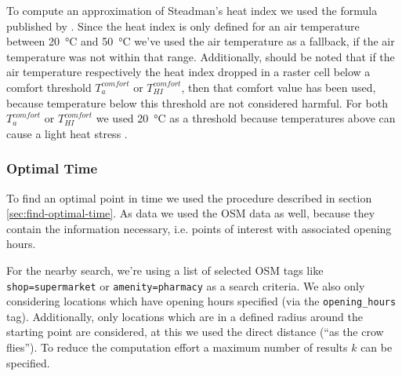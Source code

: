 To compute an approximation of Steadman's heat index we used the formula published by \textcite[77]{Stull2011}. Since the heat index is only defined for an air temperature between \SI{20}{\celsius} and \SI{50}{\celsius} we've used the air temperature as a fallback, if the air temperature was not within that range. Additionally, should be noted that if the air temperature respectively the heat index dropped in a raster cell below a comfort threshold $T_a^{comfort}$ or $T_{HI}^{comfort}$, then that comfort value has been used, because temperature below this threshold are not considered harmful. For both  $T_a^{comfort}$ or $T_{HI}^{comfort}$ we used \SI{20}{\celsius} as a threshold because temperatures above can cause a light heat stress \parencite{Staiger2011}.

\subsubsection{Optimal Time}

To find an optimal point in time we used the procedure described in section \ref{sec:find-optimal-time}. As data we used the OSM data as well, because they contain the information necessary, i.e. points of interest with associated opening hours. 

For the nearby search,  we're using a list of selected OSM tags like \verb|shop=supermarket| or \verb|amenity=pharmacy| as a search criteria. We also only considering locations which have opening hours specified (via the \verb|opening_hours| tag). Additionally, only locations which are in a defined radius around the starting point are considered, at this we used the direct distance (“as the crow flies”). To reduce the computation effort a maximum number of results $k$ can be specified.


